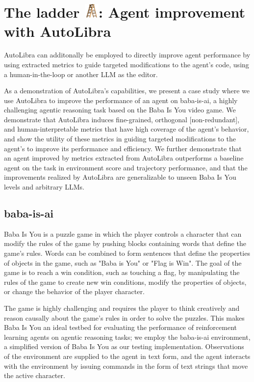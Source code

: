 \section{The ladder \protect\includegraphics[height=1em]{figs/ladder.png}: Agent improvement with AutoLibra}

AutoLibra can additonally be employed to directly improve agent performance by using extracted metrics to guide targeted modifications to the agent's code, using a human-in-the-loop or another LLM as the editor.

As a demonstration of AutoLibra's capabilities, we present a case study where we use AutoLibra to improve the performance of an agent on baba-is-ai, a highly challenging agentic reasoning task based on the Baba Is You video game. We demonstrate that AutoLibra induces fine-grained, orthogonal [non-redundant], and human-interpretable metrics that have high coverage of the agent's behavior, and show the utility of these metrics in guiding targeted modifications to the agent's to improve its performance and efficiency. We further demonstrate that an agent improved by metrics extracted from AutoLibra outperforms a baseline agent on the task in environment score and trajectory performance, and that the improvements realized by AutoLibra are generalizable to unseen Baba Is You levels and arbitrary LLMs.

\subsection{baba-is-ai}
Baba Is You is a puzzle game in which the player controls a character that can modify the rules of the game by pushing blocks containing words that define the game's rules. Words can be combined to form sentences that define the properties of objects in the game, such as "Baba is You" or "Flag is Win". The goal of the game is to reach a win condition, such as touching a flag, by manipulating the rules of the game to create new win conditions, modify the properties of objects, or change the behavior of the player character.

The game is highly challenging and requires the player to think creatively and reason causally about the game's rules in order to solve the puzzles. This makes Baba Is You an ideal testbed for evaluating the performance of reinforcement learning agents on agentic reasoning tasks; we employ the baba-is-ai environment, a simplified version of Baba Is You \cite{cloos2024babaaibreakrules, paglieri2024balrog} as our testing implementation. Observations of the environment are supplied to the agent in text form, and the agent interacts with the environment by issuing commands in the form of text strings that move the active character.

